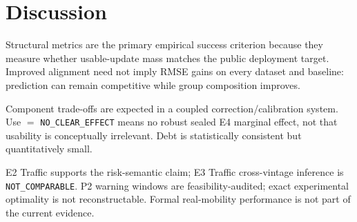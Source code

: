 \section{Discussion}
Structural metrics are the primary empirical success criterion because they measure whether usable-update mass matches the public deployment target. Improved alignment need not imply RMSE gains on every dataset and baseline: prediction can remain competitive while group composition improves.

Component trade-offs are expected in a coupled correction/calibration system. Use \(=\) \texttt{NO\_CLEAR\_EFFECT} means no robust sealed E4 marginal effect, not that usability is conceptually irrelevant. Debt is statistically consistent but quantitatively small.

E2 Traffic supports the risk-semantic claim; E3 Traffic cross-vintage inference is \texttt{NOT\_COMPARABLE}. P2 warning windows are feasibility-audited; exact experimental optimality is not reconstructable. Formal real-mobility performance is not part of the current evidence.

